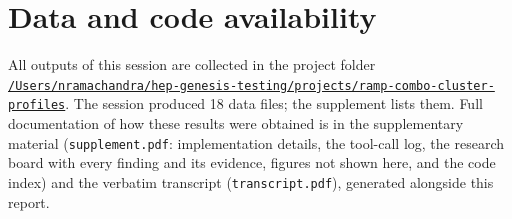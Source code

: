 \documentclass[11pt,a4paper]{article}
\begin{document}
\section*{Data and code availability}
All outputs of this session are collected in the project folder \href{file:///Users/nramachandra/hep-genesis-testing/projects/ramp-combo-cluster-profiles}{\texttt{/\allowbreak{}Users/\allowbreak{}nramachandra/\allowbreak{}hep-genesis-testing/\allowbreak{}projects/\allowbreak{}ramp-combo-cluster-profiles}}.
The session produced 18 data files; the supplement lists them.
Full documentation of how these results were obtained is in the supplementary material (\texttt{supplement.pdf}: implementation details, the tool-call log, the research board with every finding and its evidence, figures not shown here, and the code index) and the verbatim transcript (\texttt{transcript.pdf}), generated alongside this report.
\end{document}
